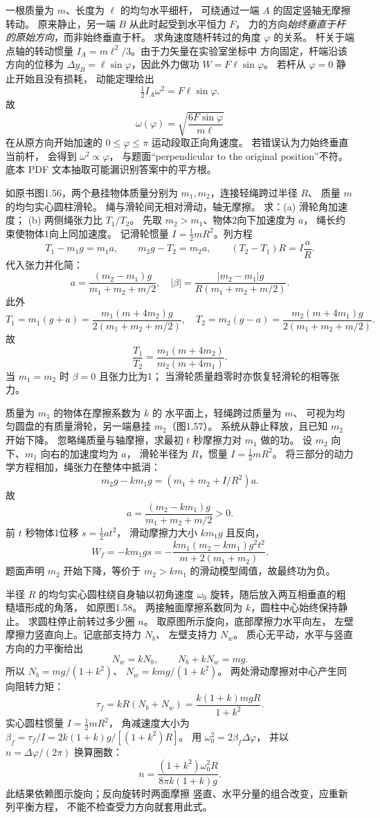 一根质量为 $m$、长度为 $\ell$ 的均匀水平细杆，
可绕通过一端 $A$ 的固定竖轴无摩擦转动。
原来静止，另一端 $B$ 从此时起受到水平恒力 $F$，
力的方向\emph{始终垂直于杆的原始方向}，而非始终垂直于杆。
求角速度随杆转过的角度 $\varphi$ 的关系。
\exsolution
杆关于端点轴的转动惯量
$I_A=m\ell^2/3$。由于力矢量在实验室坐标中
方向固定，杆端沿该方向的位移为
$\Delta y_B=\ell\sin\varphi$，因此外力做功
$W=F\ell\sin\varphi$。
若杆从 $\varphi=0$ 静止开始且没有损耗，
动能定理给出
\[
\tfrac12I_A\omega^2=F\ell\sin\varphi.
\]
故
\[
\boxed{\omega(\varphi)=
\sqrt{\frac{6F\sin\varphi}{m\ell}}}
\]
在从原方向开始加速的 $0\le\varphi\le\pi$
运动段取正向角速度。
\excheck 若错误认为力始终垂直当前杆，
会得到 $\omega^2\propto\varphi$，
与题面“perpendicular to the original position”不符。
底本 PDF 文本抽取可能漏识别答案中的平方根。

如原书图1.56，两个悬挂物体质量分别为
$m_1,m_2$，连接轻绳跨过半径 $R$、
质量 $m$ 的均匀实心圆柱滑轮。
绳与滑轮间无相对滑动，轴无摩擦。
求：(a) 滑轮角加速度；
(b) 两侧绳张力比 $T_1/T_2$。
\exsolution
先取 $m_2>m_1$、物体2向下加速度为 $a$，
绳长约束使物体1向上同加速度。
记滑轮惯量 $I=\frac12mR^2$。列方程
\[
T_1-m_1g=m_1a,\qquad
m_2g-T_2=m_2a,\qquad
(T_2-T_1)R=I\frac aR.
\]
代入张力并化简：
\[
a=\frac{(m_2-m_1)g}{m_1+m_2+m/2},
\quad
\boxed{|\beta|=\frac{|m_2-m_1|g}
{R(m_1+m_2+m/2)}}.
\]
此外
\[
T_1=m_1(g+a)
=\frac{m_1(m+4m_2)g}{2(m_1+m_2+m/2)},
\quad
T_2=m_2(g-a)
=\frac{m_2(m+4m_1)g}{2(m_1+m_2+m/2)}.
\]
故
\[
\boxed{\frac{T_1}{T_2}
=\frac{m_1(m+4m_2)}{m_2(m+4m_1)}}.
\]
\excheck 当 $m_1=m_2$ 时 $\beta=0$ 且张力比为1；
当滑轮质量趋零时亦恢复轻滑轮的相等张力。

质量为 $m_1$ 的物体在摩擦系数为 $k$ 的
水平面上，轻绳跨过质量为 $m$、
可视为均匀圆盘的有质量滑轮，另一端悬挂 $m_2$（图1.57）。
系统从静止释放，且已知 $m_2$ 开始下降。
忽略绳质量与轴摩擦，求最初 $t$ 秒摩擦力对 $m_1$ 做的功。
\exsolution
设 $m_2$ 向下、$m_1$ 向右的加速度均为 $a$，
滑轮半径为 $R$，惯量 $I=\frac12mR^2$。
将三部分的动力学方程相加，绳张力在整体中抵消：
\[
m_2g-km_1g=(m_1+m_2+I/R^2)a.
\]
故
\[
a=\frac{(m_2-km_1)g}{m_1+m_2+m/2}>0.
\]
前 $t$ 秒物体1位移 $s=\frac12at^2$，
滑动摩擦力大小 $km_1g$ 且反向，
\[
W_f=-km_1gs
=\boxed{-\frac{k m_1(m_2-km_1)g^2t^2}
{m+2(m_1+m_2)}}.
\]
\excheck 题面声明 $m_2$ 开始下降，等价于
$ m_2>km_1$ 的滑动模型阈值，故最终功为负。

半径 $R$ 的均匀实心圆柱绕自身轴以初角速度
$\omega_0$ 旋转，随后放入两互相垂直的粗糙墙形成的角落，
如原图1.58。
两接触面摩擦系数同为 $k$，圆柱中心始终保持静止。
求圆柱停止前转过多少圈 $n$。
\exsolution
取原图所示旋向，底部摩擦力水平向左，
左壁摩擦力竖直向上。记底部支持力 $N_b$、
左壁支持力 $N_w$。
质心无平动，水平与竖直方向的力平衡给出
\[
N_w=kN_b,\qquad N_b+kN_w=mg.
\]
所以
$N_b=mg/(1+k^2)$、
$N_w=kmg/(1+k^2)$。
两处滑动摩擦对中心产生同向阻转力矩：
\[
\tau_f=kR(N_b+N_w)
=\frac{k(1+k)mgR}{1+k^2}.
\]
实心圆柱惯量 $I=\frac12mR^2$，
角减速度大小为
$\beta_f=\tau_f/I=
2k(1+k)g/[(1+k^2)R]$。
用 $\omega_0^2=2\beta_f\Delta\varphi$，
并以 $n=\Delta\varphi/(2\pi)$ 换算圈数：
\[
\boxed{n=\frac{(1+k^2)\omega_0^2R}
{8\pi k(1+k)g}}.
\]
\excheck 此结果依赖图示旋向；反向旋转时两面摩擦
竖直、水平分量的组合改变，应重新列平衡方程，
不能不检查受力方向就套用此式。

